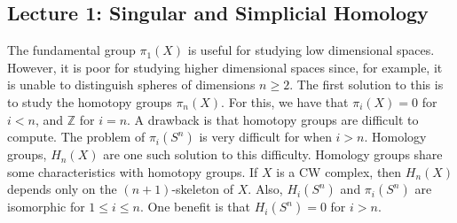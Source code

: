     \subsection{Lecture 1: Singular and Simplicial Homology}
            The fundamental group $\pi_{1}(X)$ is useful for
            studying low dimensional spaces. However, it is poor for
            studying higher dimensional spaces since, for example,
            it is unable to distinguish spheres of dimensions
            $n\geq 2$. The first solution to this is to study
            the homotopy groups $\pi_{n}(X)$. For this, we have
            that $\pi_{i}(X)=0$ for $i<n$, and $\mathbb{Z}$ for
            $i=n$. A drawback is that homotopy groups are
            difficult to compute. The problem of $\pi_{i}(S^{n})$
            is very difficult for when $i>n$. Homology groups,
            $H_{n}(X)$ are one such solution to this difficulty.
            Homology groups share some characteristics with
            homotopy groups. If $X$ is a CW complex, then $H_{n}(X)$
            depends only on the $(n+1)$-skeleton of $X$. Also,
            $H_{i}(S^{n})$ and $\pi_{i}(S^{n})$ are isomorphic for
            $1\leq i\leq n$. One benefit is that $H_{i}(S^{n})=0$
            for $i>n$.

